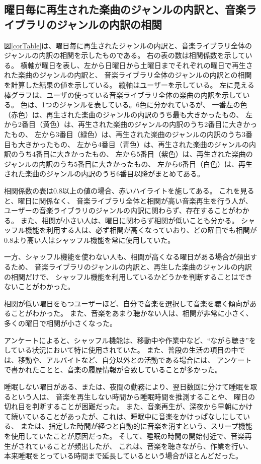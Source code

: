 \documentclass[11pt, onecolumn]{jsarticle}
\begin{document}
\subsection{曜日毎に再生された楽曲のジャンルの内訳と、音楽ライブラリのジャンルの内訳の相関}
図\ref{corTable}は、曜日毎に再生されたジャンルの内訳と、音楽ライブラリ全体のジャンルの内訳の相関を示したものである。
右の表の数は相関係数を示している。
横軸が曜日を表し、左から日曜日から土曜日までそれぞれの曜日で再生された楽曲のジャンルの内訳と、
音楽ライブラリ全体のジャンルの内訳との相関を計算した結果の値を示している。
縦軸はユーザーを示している。
左に見える棒グラフは、ユーザの使っている音楽ライブラリ全体の楽曲の内訳を示している。
色は、1つのジャンルを表している。6色に分かれているが、
一番左の色（赤色）は、再生された楽曲のジャンルの内訳のうち最も大きかったもの、
左から2番目（黄色）は、再生された楽曲のジャンルの内訳のうち2番目に大きかったもの、
左から3番目（緑色）は、再生された楽曲のジャンルの内訳のうち3番目も大きかったもの、
左から4番目（青色）は、再生された楽曲のジャンルの内訳のうち4番目に大きかったもの、
左から5番目（紫色）は、再生された楽曲のジャンルの内訳のうち5番目に大きかったもの、
左から6番目（白色）は、再生された楽曲のジャンルの内訳のうち6番目以降がまとめてある。

相関係数の表は0.8以上の値の場合、赤いハイライトを施してある。
これを見ると、曜日に関係なく、
音楽ライブラリ全体と相関が高い音楽再生を行う人が、
ユーザーの音楽ライブラリのジャンルの内訳に関わらず、存在することがわかる。
また、相関が小さい人は、曜日に関わらず相関が低いことも分かる。
シャッフル機能を利用する人は、必ず相関が高くなっていおり、どの曜日でも相関が0.8より高い人はシャッフル機能を常に使用していた。

一方、シャッフル機能を使わない人も、相関が高くなる曜日がある場合が頻出するため、
音楽ライブラリのジャンルの内訳と、再生した楽曲のジャンルの内訳の相関だけで、
シャッフル機能を利用しているかどうかを判断することはできないことがわかった。

相関が低い曜日をもつユーザーほど、自分で音楽を選択して音楽を聴く傾向があることがわかった。
また、音楽をあまり聴かない人は、相関が非常に小さく、多くの曜日で相関が小さくなった。

アンケートによると、シャッフル機能は、移動中や作業中など、``ながら聴き''をしている状況において特に使用されていた。
また、普段の生活の項目の中では、移動や、アルバイトなど、自分以外との活動である場合には、
アンケートで書かれたことと、音楽の履歴情報が合致していることが多かった。

睡眠しない曜日がある、または、夜間の勤務により、翌日数回に分けて睡眠を取るという人は、
音楽を再生しない時間から睡眠時間を推測することや、
曜日の切れ目を判断することが困難だった。
また、音楽再生が、深夜から早朝にかけて続いていることがあったが、これは、睡眠中に音楽をかけっぱなしにしている、
または、指定した時間が経つと自動的に音楽を消すという、スリープ機能を使用していたことが原因だった。
そして、睡眠の時間の開始付近で、音楽再生がされていることが頻出したが、
これは、音楽を聴きながら、作業を行い、本来睡眠をとっている時間まで延長しているという場合がほとんどだった。
\end{document}
